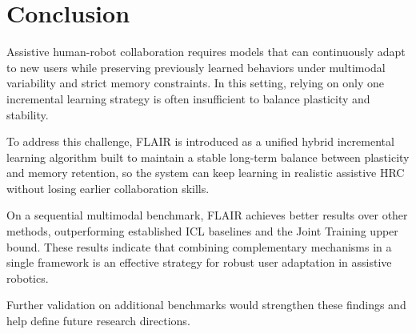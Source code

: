 \documentclass[3p,times,procedia]{elsarticle}
\begin{document}




\section{Conclusion}

Assistive human-robot collaboration requires models that can continuously adapt to new users while preserving previously learned behaviors under multimodal variability and strict memory constraints. In this setting, relying on only one incremental learning strategy is often insufficient to balance plasticity and stability.

To address this challenge, FLAIR is introduced as a unified hybrid incremental learning algorithm built to maintain a stable long-term balance between plasticity and memory retention, so the system can keep learning in realistic assistive HRC without losing earlier collaboration skills.

On a sequential multimodal benchmark, FLAIR achieves better results over other methods, outperforming established ICL baselines and the Joint Training upper bound. These results indicate that combining complementary mechanisms in a single framework is an effective strategy for robust user adaptation in assistive robotics. 

Further validation on additional benchmarks would strengthen these findings and help define future research directions.

\newpage


\end{document}
